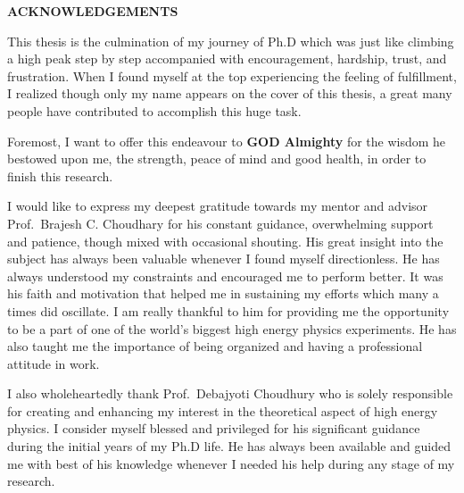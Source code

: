 \begin{center}
\doublespacing
{\large \textbf{ACKNOWLEDGEMENTS}}
\end{center}

\onehalfspacing

This thesis is the culmination of my journey of Ph.D which was just like climbing a high peak step by step accompanied with encouragement,
hardship, trust, and frustration. When I found myself at the top experiencing the feeling of fulfillment, I realized though only my name appears on
the cover of this thesis, a great many people have contributed to accomplish this huge task. 

Foremost, I want to offer this endeavour to \textbf{GOD Almighty} for the wisdom he bestowed upon me, the strength, peace of mind and good health, in order to finish
this research.

I would like to express my deepest gratitude towards my mentor and advisor Prof.\ Brajesh C. Choudhary for his constant guidance, overwhelming support and patience,
though mixed with occasional shouting.
His great insight into the subject has always been valuable whenever I found myself directionless. 
He has always understood my constraints and encouraged me to perform better. It was his faith and motivation that helped me in sustaining my efforts which many
a times did oscillate. I am really thankful to him for providing me the opportunity to be a part of one of the world's biggest high energy physics experiments.
He has also taught me the importance of being organized and having a professional attitude in work. 

I also wholeheartedly thank Prof.\ Debajyoti Choudhury who is solely responsible for creating and enhancing my interest in the theoretical aspect of high energy
physics. I consider myself blessed and privileged for his significant guidance during the initial years of my Ph.D life. He has always been available and guided me
with best of his knowledge whenever I needed his help during any stage of my research. 

